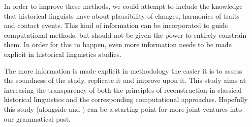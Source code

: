 \documentclass[a4paper,10pt]{article} %
\begin{document}
In order to improve these methods, we could attempt to include the knowledge that historical linguists have about plausibility of changes, harmonics of traits and contact events. This kind of information can be incorporated to guide computational methods, but should not be given the power to entirely constrain them. In order for this to happen, even more information needs to be made explicit in historical linguistics studies.

The more information is made explicit in methodology the easier it is to assess the soundness of the study, replicate it and improve upon it. This study aims at increasing the transparency of both the principles of reconstruction in classical historical linguistics and the corresponding  computational approaches. Hopefully this study (alongside \citet{carling2021} and \citet{goldstein_2022}) can be a starting point for more joint ventures into our grammatical past.






\newpage

\singlespacing


\end{document}

